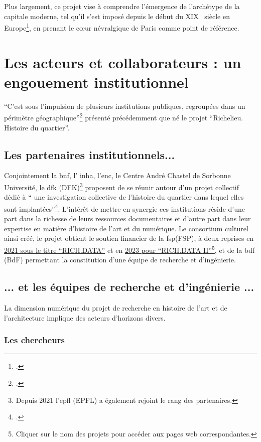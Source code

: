 Plus largement, ce projet vise à comprendre l'émergence de l'archétype de la capitale moderne, tel qu'il s'est imposé depuis le début du XIX\ieme~  siècle en Europe\footcite{CHARLEStemps2009, CHARLECapitales2023}, en prenant le cœur névralgique de Paris comme point de référence.

\section{Les acteurs et collaborateurs : un engouement institutionnel}
\enquote{C'est sous l'impulsion de plusieurs institutions publiques, regroupées dans un périmètre géographique}\footcite{DUVETTEquartier2024} présenté précédemment que né le projet \enquote{Richelieu. Histoire du quartier}. 

\subsection{Les partenaires institutionnels...}
Conjointement la \acrshort{bnf}, l' \acrshort{inha}, l'\acrshort{enc}, le Centre André Chastel de Sorbonne Université, le \acrlong{dfk} (DFK)\footnote{Depuis 2021 l'\acrlong{epfl} (EPFL) a également rejoint le rang des partenaires.} proposent de se réunir autour d'un projet collectif dédié à \enquote{ une investigation collective de l'histoire du quartier dans lequel elles sont implantées}\footcite{PROJETFondation2021}. L'intérêt de mettre en synergie ces institutions réside d'une part dans la richesse de leurs ressources documentaires et d'autre part dans leur expertise en matière d'histoire de l'art et du numérique. Le consortium culturel ainsi créé, le projet obtient le soutien financier de la \acrlong{fsp}(FSP), à deux reprises en \href{https://www.sciences-patrimoine.org/projet/rich-data/}{2021 sous le titre \enquote{RICH.DATA}} et en \href{https://www.sciences-patrimoine.org/projet/richdata2/}{2023 pour \enquote{RICH.DATA II}}\footnote{Cliquer sur le nom des projets pour accéder aux pages web correspondantes.}, et de la \acrlong{bdf} (BdF) permettant la constitution d'une équipe de recherche et d'ingénierie. 

\subsection{... et les équipes de recherche et d'ingénierie ...}
La dimension numérique du projet de recherche en histoire de l'art et de l'architecture implique des acteurs d'horizons divers. 

 
\subsubsection{Les chercheurs} 

